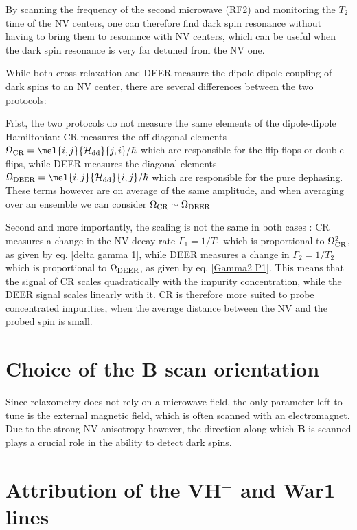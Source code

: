 \documentclass[a4paper]{report}
\begin{document}
By scanning the frequency of the second microwave (RF2) and monitoring the $T_2$ time of the NV centers, one can therefore find dark spin resonance without having to bring them to resonance with NV centers, which can be useful when the dark spin resonance is very far detuned from the NV one.

While both cross-relaxation and DEER measure the dipole-dipole coupling of dark spins to an NV center, there are several differences between the two protocols:

Frist, the two protocols do not measure the same elements of the dipole-dipole Hamiltonian: CR measures the off-diagonal elements $\Omega_{\rm CR}=\mel{i,j}{\mathcal{H}_{\rm dd}}{j,i}/\hbar$ which are responsible for the flip-flops or double flips, while DEER measures the diagonal elements $\Omega_{\rm DEER}=\mel{i,j}{\mathcal{H}_{\rm dd}}{i,j}/\hbar$ which are responsible for the pure dephasing. These terms however are on average of the same amplitude, and when averaging over an ensemble we can consider $\Omega_{\rm CR} \sim \Omega_{\rm DEER}$

Second and more importantly, the scaling is not the same in both cases : CR measures a change in the NV decay rate $\Gamma_1=1/T_1$ which is proportional to $\Omega_{\rm CR}^2$, as given by eq. \ref{delta gamma 1}, while DEER measures a change in $\Gamma_2=1/T_2$ which is proportional to $\Omega_{\rm DEER}$, as given by eq. \ref{Gamma2 P1}. This means that the signal of CR scales quadratically with the impurity concentration, while the DEER signal scales linearly with it. CR is therefore more suited to probe concentrated impurities, when the average distance between the NV and the probed spin is small.

\section{Choice of the $\mathbf{B}$ scan orientation}

Since relaxometry does not rely on a microwave field, the only parameter left to tune is the external magnetic field, which is often scanned with an electromagnet. Due to the strong NV anisotropy however, the direction along which $\mathbf{B}$ is scanned plays a crucial role in the ability to detect dark spins.


\section{Attribution of the VH$^-$ and War1 lines}


\printbibliography
\end{document}
